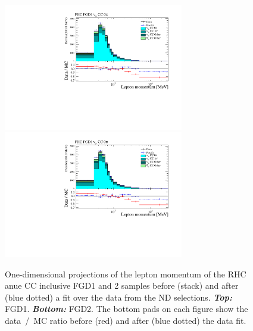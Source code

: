 \begin{figure}[ht]
  \center
  \includegraphics[keepaspectratio=true,width=0.7\textwidth,page=21]{images/BANFF/reactionCodeStacks_PrefitAndPostfit_mom.pdf}\\
  \includegraphics[keepaspectratio=true,width=0.7\textwidth,page=22]{images/BANFF/reactionCodeStacks_PrefitAndPostfit_mom.pdf}
  \begin{center}
    \caption[RHC $\bar{\nu}_e$ FGD1 and 2 samples before and after a
    fit over the data from the ND280 selections]{One-dimensional
      projections of the lepton momentum of the \Gls{RHC} \Gls{anue}
      \Gls{CC} inclusive \Gls{FGD}1 and 2 samples before (stack) and
      after (blue dotted) a fit over the data from the \Gls{ND}
      selections. \textbf{\textit{Top:}}
      \Gls{FGD}1. \textbf{\textit{Bottom:}} \Gls{FGD}2. The bottom
      pads on each figure show the data~/~\Gls{MC} ratio before (red)
      and after (blue dotted) the data fit.}
    \label{fig:anue}
  \end{center}
\end{figure}


